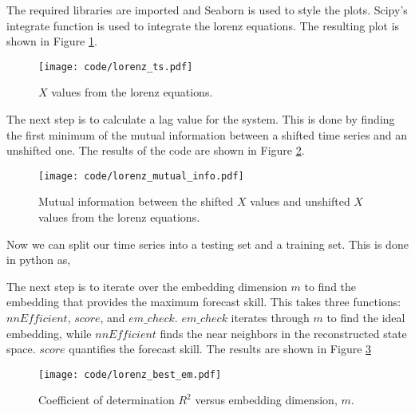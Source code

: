 

The required libraries are imported and Seaborn is used to style the plots. Scipy's integrate function is used to integrate the lorenz equations. The resulting plot is shown in Figure \ref{create_series}.

\begin{figure}[htbp] %
   \centering
   \texttt{[image: code/lorenz\_ts.pdf]} 
   \caption{$X$ values from the lorenz equations.}
   \label{create_series}
\end{figure}


The next step is to calculate a lag value for the system. This is done by finding the first minimum of the mutual information between a shifted time series and an unshifted one. The results of the code are shown in Figure \ref{code_mutual_info}.



\begin{figure}[htbp] %
   \centering
   \texttt{[image: code/lorenz\_mutual\_info.pdf]} 
   \caption{Mutual information between the shifted $X$ values and unshifted $X$ values from the lorenz equations.}
   \label{code_mutual_info}
\end{figure}

Now we can split our time series into a testing set and a training set. This is done in python as,




The next step is to iterate over the embedding dimension $m$ to find the embedding that provides the maximum forecast skill. This takes three functions: $nnEfficient$, $score$, and $em\_check$. $em\_check$ iterates through $m$ to find the ideal embedding, while $nnEfficient$ finds the near neighbors in the reconstructed state space. $score$ quantifies the forecast skill. The results are shown in Figure \ref{best_embedding}



\begin{figure}[htbp] %
   \centering
   \texttt{[image: code/lorenz\_best\_em.pdf]} 
   \caption{Coefficient of determination $R^2$ versus embedding dimension, $m$.}
   \label{best_embedding}
\end{figure}

